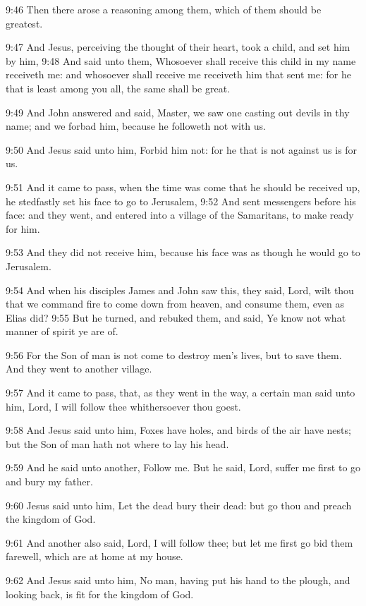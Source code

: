 9:46 Then there arose a reasoning among them, which of them should be
greatest.

9:47 And Jesus, perceiving the thought of their heart, took a child,
and set him by him, 9:48 And said unto them, Whosoever shall receive
this child in my name receiveth me: and whosoever shall receive me
receiveth him that sent me: for he that is least among you all, the
same shall be great.

9:49 And John answered and said, Master, we saw one casting out devils
in thy name; and we forbad him, because he followeth not with us.

9:50 And Jesus said unto him, Forbid him not: for he that is not
against us is for us.

9:51 And it came to pass, when the time was come that he should be
received up, he stedfastly set his face to go to Jerusalem, 9:52 And
sent messengers before his face: and they went, and entered into a
village of the Samaritans, to make ready for him.

9:53 And they did not receive him, because his face was as though he
would go to Jerusalem.

9:54 And when his disciples James and John saw this, they said, Lord,
wilt thou that we command fire to come down from heaven, and consume
them, even as Elias did?  9:55 But he turned, and rebuked them, and
said, Ye know not what manner of spirit ye are of.

9:56 For the Son of man is not come to destroy men's lives, but to
save them. And they went to another village.

9:57 And it came to pass, that, as they went in the way, a certain man
said unto him, Lord, I will follow thee whithersoever thou goest.

9:58 And Jesus said unto him, Foxes have holes, and birds of the air
have nests; but the Son of man hath not where to lay his head.

9:59 And he said unto another, Follow me. But he said, Lord, suffer me
first to go and bury my father.

9:60 Jesus said unto him, Let the dead bury their dead: but go thou
and preach the kingdom of God.

9:61 And another also said, Lord, I will follow thee; but let me first
go bid them farewell, which are at home at my house.

9:62 And Jesus said unto him, No man, having put his hand to the
plough, and looking back, is fit for the kingdom of God.

